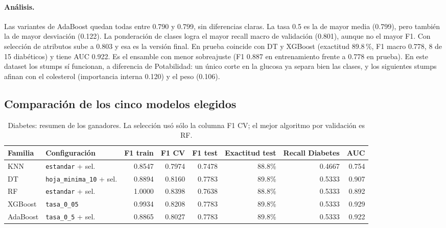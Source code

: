 \documentclass[11pt]{article}
\begin{document}
\paragraph{Análisis.} Las variantes de AdaBoost quedan todas entre 0.790 y 0.799, sin diferencias claras. La
tasa 0.5 es la de mayor media (0.799), pero también la de mayor desviación (0.122). La
ponderación de clases logra el mayor recall macro de validación (0.801), aunque no el
mayor F1. Con selección de atributos sube a 0.803 y esa es la versión final. En prueba
coincide con DT y XGBoost (exactitud 89.8\,\%, F1 macro 0.778, 8 de 15 diabéticos) y
tiene AUC 0.922. Es el ensamble con menor sobreajuste (F1 0.887 en entrenamiento frente
a 0.778 en prueba). En este dataset los stumps sí funcionan, a diferencia de
Potabilidad: un único corte en la glucosa ya separa bien las clases, y los siguientes
stumps afinan con el colesterol (importancia interna 0.120) y el peso (0.106).

\FloatBarrier

\subsection{Comparación de los cinco modelos elegidos}

\begin{table}[H]\centering\footnotesize
\caption{Diabetes: resumen de los ganadores. La selección usó sólo la columna F1 CV; el mejor algoritmo por validación es RF.}
\begin{tabular}{llrrrrrr}\toprule
Familia & Configuración & F1 train & F1 CV & F1 test & Exactitud test & Recall Diabetes & AUC \\ \midrule
KNN & \texttt{estandar} + sel. & 0.8547 & 0.7974 & 0.7478 & 88.8\% & 0.4667 & 0.754 \\
DT & \texttt{hoja\_\allowbreak{}minima\_\allowbreak{}10} + sel. & 0.8894 & 0.8160 & 0.7783 & 89.8\% & 0.5333 & 0.907 \\
RF & \texttt{estandar} + sel. & 1.0000 & 0.8398 & 0.7638 & 88.8\% & 0.5333 & 0.892 \\
XGBoost & \texttt{tasa\_\allowbreak{}0\_\allowbreak{}05} & 0.9934 & 0.8208 & 0.7783 & 89.8\% & 0.5333 & 0.929 \\
AdaBoost & \texttt{tasa\_\allowbreak{}0\_\allowbreak{}5} + sel. & 0.8865 & 0.8027 & 0.7783 & 89.8\% & 0.5333 & 0.922 \\
\bottomrule\end{tabular}
\end{table}
\end{document}
